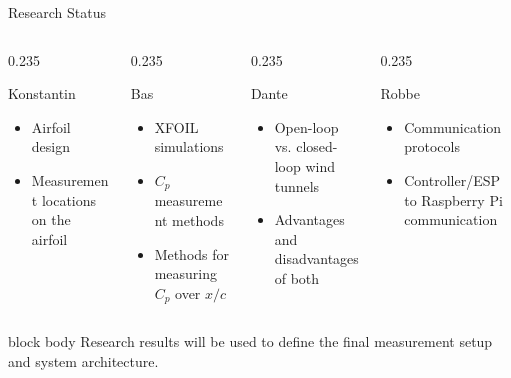 \documentclass[aspectratio=169,10pt]{beamer}
\newcommand{\Cp}{\ensuremath{C_p}}
\newcommand{\xc}{\ensuremath{x/c}}
\newenvironment{points}{\begin{itemize}\setlength{\itemsep}{0.45em}}{\end{itemize}}
\begin{document}
\begin{frame}{Research Status}
  \begin{columns}[T,onlytextwidth]
    \begin{column}{0.235\textwidth}
      \begin{block}{Konstantin}
        \begin{points}
          \item Airfoil design
          \item Measurement locations on the airfoil
        \end{points}
      \end{block}
    \end{column}
    \begin{column}{0.235\textwidth}
      \begin{block}{Bas}
        \begin{points}
          \item XFOIL simulations
          \item \Cp{} measurement methods
          \item Methods for measuring \Cp{} over \xc
        \end{points}
      \end{block}
    \end{column}
    \begin{column}{0.235\textwidth}
      \begin{block}{Dante}
        \begin{points}
          \item Open-loop vs. closed-loop wind tunnels
          \item Advantages and disadvantages of both
        \end{points}
      \end{block}
    \end{column}
    \begin{column}{0.235\textwidth}
      \begin{block}{Robbe}
        \begin{points}
          \item Communication protocols
          \item Controller/ESP to Raspberry Pi communication
        \end{points}
      \end{block}
    \end{column}
  \end{columns}
  \vfill
  \begin{beamercolorbox}[sep=8pt,center,rounded=true]{block body}
    Research results will be used to define the final measurement setup\newline
    and system architecture.
  \end{beamercolorbox}
\end{frame}
\end{document}
